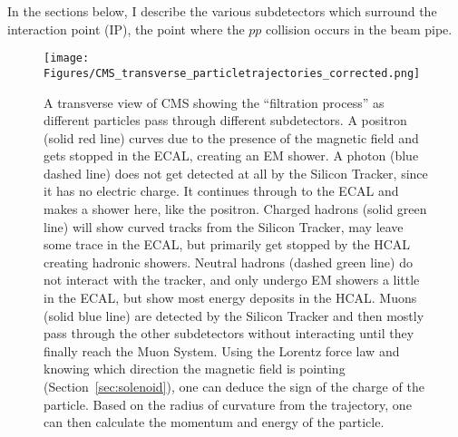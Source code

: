 In the sections below, I describe the various subdetectors which surround the interaction point (IP), the point where the $pp$ collision occurs in the beam pipe.
\begin{figure}[pbth]
\centering
\texttt{[image: Figures/CMS\_transverse\_particletrajectories\_corrected.png]}
    \caption{
    A transverse view of CMS showing the ``filtration process'' as different particles pass through different subdetectors.
    A positron (solid red line) curves due to the presence of the magnetic field and gets stopped in the ECAL, creating an EM shower.
    A photon (blue dashed line) does not get detected at all by the Silicon Tracker, since it has no electric charge.
    It continues through to the ECAL and makes a shower here, like the positron.
    Charged hadrons (solid green line) will show curved tracks from the Silicon Tracker, may leave some trace in the ECAL, but primarily get stopped by the HCAL creating hadronic showers.
    Neutral hadrons (dashed green line) do not interact with the tracker, and only undergo EM showers a little in the ECAL, but show most energy deposits in the HCAL.
    Muons (solid blue line) are detected by the Silicon Tracker and then mostly pass through the other subdetectors without interacting until they finally reach the Muon System.
    Using the Lorentz force law and knowing which direction the magnetic field is pointing (Section~\ref{sec:solenoid}), one can deduce the sign of the charge of the particle. 
    Based on the radius of curvature from the trajectory, one can then calculate the momentum and energy of the particle.
    } 
    \label{fig:cms_particle_trajectories}
\end{figure}

